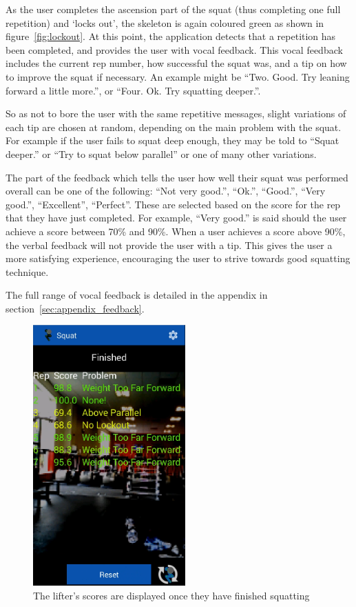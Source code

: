 As the user completes the ascension part of the squat (thus completing one full repetition) and `locks out', the skeleton is again coloured green as shown in figure~\ref{fig:lockout}. At this point, the application detects that a repetition has been completed, and provides the user with vocal feedback. This vocal feedback includes the current rep number, how successful the squat was, and a tip on how to improve the squat if necessary. An example might be ``Two. Good. Try leaning forward a little more.'', or ``Four. Ok. Try squatting deeper.''.

So as not to bore the user with the same repetitive messages, slight variations of each tip are chosen at random, depending on the main problem with the squat. For example if the user fails to squat deep enough, they may be told to ``Squat deeper.'' or ``Try to squat below parallel'' or one of many other variations.

The part of the feedback which tells the user how well their squat was performed overall can be one of the following: ``Not very good.'', ``Ok.'', ``Good.'', ``Very good.'', ``Excellent'', ``Perfect''. These are selected based on the score for the rep that they have just completed. For example, ``Very good.'' is said should the user achieve a score between 70\% and 90\%. When a user achieves a score above 90\%, the verbal feedback will not provide the user with a tip. This gives the user a more satisfying experience, encouraging the user to strive towards good squatting technique.

The full range of vocal feedback is detailed in the appendix in section~\ref{sec:appendix_feedback}.

\begin{figure}[H]
    \centering
	\includegraphics[height=10cm]{application/images/scores}
\caption{The lifter's scores are displayed once they have finished squatting}
\label{fig:scores}
\end{figure}

